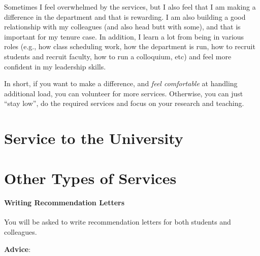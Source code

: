 \documentclass[oneside,11pt,dvipsnames]{book}
\begin{document}
Sometimes I feel overwhelmed by the services, but I also feel that I am making a difference in the department and that is rewarding.
I am also building a good relationship with my colleagues (and also head butt with some), and that is important for my tenure case.
In addition, I learn a lot from being in various roles (e.g., how class scheduling work, how the department is run, how to recruit students and recruit faculty, how to run a colloquium, etc) and feel more confident in my leadership skills.

In short, if you want to make a difference, and \emph{feel comfortable} at handling additional load, you can volunteer for more services. Otherwise, you can just ``stay low'',
do the required services and focus on your research and teaching.

\section{Service to the University}
\section{Other Types of Services}
\paragraph{Writing Recommendation Letters} You will be asked to write recommendation letters for both students and colleagues.

\textbf{Advice}: %




\end{document}
